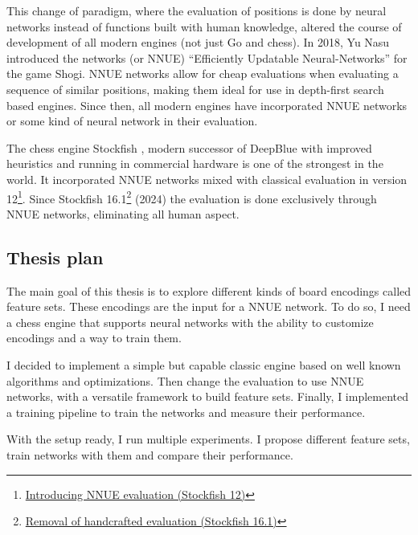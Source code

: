This change of paradigm, where the evaluation of positions is done by neural networks instead of functions built with human knowledge, altered the course of development of all modern engines (not just Go and chess). In 2018, Yu Nasu introduced the networks  (or NNUE) ``Efficiently Updatable Neural-Networks'' \cite{nnue:2018} for the game Shogi. NNUE networks allow for cheap evaluations when evaluating a sequence of similar positions, making them ideal for use in depth-first search based engines. Since then, all modern engines have incorporated NNUE networks or some kind of neural network in their evaluation.

The chess engine Stockfish \cite{stockfish}, modern successor of DeepBlue with improved heuristics and running in commercial hardware is one of the strongest in the world. It incorporated NNUE networks mixed with classical evaluation in version 12\footnote[1]{\href{https://stockfishchess.org/blog/2020/introducing-nnue-evaluation/}{Introducing NNUE evaluation (Stockfish 12)}}. Since Stockfish 16.1\footnote[2]{\href{https://stockfishchess.org/blog/2024/stockfish-16-1/}{Removal of handcrafted evaluation (Stockfish 16.1)}} (2024) the evaluation is done exclusively through NNUE networks, eliminating all human aspect.

\newpage
\subsection{Thesis plan}

The main goal of this thesis is to explore different kinds of board encodings called feature sets. These encodings are the input for a NNUE network. To do so, I need a chess engine that supports neural networks with the ability to customize encodings and a way to train them.

I decided to implement a simple but capable classic engine based on well known algorithms and optimizations. Then change the evaluation to use NNUE networks, with a versatile framework to build feature sets. Finally, I implemented a training pipeline to train the networks and measure their performance.

With the setup ready, I run multiple experiments. I propose different feature sets, train networks with them and compare their performance.

